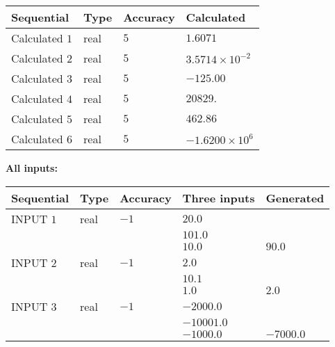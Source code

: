 \documentclass[12pt]{article}
\begin{document}
   
   
   
\noindent{}
   
   
  
  
\noindent\begin{tabular}{|l|l|l|l|}
\hline
 Sequential & Type & Accuracy & Calculated \\ 
\hline
 
 
  Calculated $            1 $ & real & $            5  $ & 
 $ 1.6071 $ 
 \\  \hline  
 
 
  Calculated $            2 $ & real & $            5  $ & 
 $ 3.5714 \times 10^{-2} $ 
 \\  \hline  
 
 
  Calculated $            3 $ & real & $            5  $ & 
 $ -125.00 $ 
 \\  \hline  
 
 
  Calculated $            4 $ & real & $            5  $ & 
 $ 20829. $ 
 \\  \hline  
 
 
  Calculated $            5 $ & real & $            5  $ & 
 $ 462.86 $ 
 \\  \hline  
 
 
  Calculated $            6 $ & real & $            5  $ & 
 $ -1.6200 \times 10^{6} $ 
 \\  \hline  
 \end{tabular}
   
   
   
   
\noindent\vspace{0.1in}\hspace{-0.08in} {\textbf{\Large{All inputs: }}}
   
   
  
  
\noindent\begin{tabular}{|l|l|l|l|l|}
\hline
 Sequential & Type & Accuracy & Three inputs & Generated \\ 
\hline
 
 
  INPUT $            1 $ & real & $           -1  $ & $
 20.0
  $ & \\
  & & &  $
 101.0
  $ & \\
  & & &  $
 10.0
 $ & $ 90.0 $ 
 \\  \hline  
 
 
  INPUT $            2 $ & real & $           -1  $ & $
 2.0
  $ & \\
  & & &  $
 10.1
  $ & \\
  & & &  $
 1.0
 $ & $ 2.0 $ 
 \\  \hline  
 
 
  INPUT $            3 $ & real & $           -1  $ & $
 -2000.0
  $ & \\
  & & &  $
 -10001.0
  $ & \\
  & & &  $
 -1000.0
 $ & $ -7000.0 $ 
 \\  \hline  
 \end{tabular}
   
\end{document}
